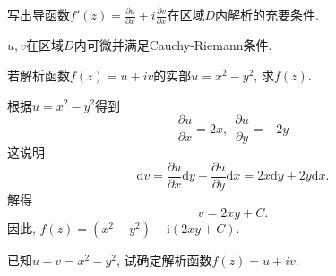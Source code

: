 \begin{yyEx}
	写出导函数$f'(z) = \frac{\partial u}{\partial x}+i\frac{\partial v}{\partial x}$在区域$D$内解析的充要条件.
\end{yyEx}

\begin{yySolution}
    $u,v$在区域$D$内可微并满足Cauchy-Riemann条件.
\end{yySolution}

\begin{yyEx}
	若解析函数$f(z) = u+iv$的实部$u = x^2 - y^2$, 求$f(z)$.
\end{yyEx}

\begin{yySolution}
    根据$u = x^2 - y^2$得到\begin{equation*}
        \frac{\partial u}{\partial x} = 2x,~~\frac{\partial u}{\partial y} = -2y
    \end{equation*}
    这说明\begin{equation*}
        \mathrm{d}v = \frac{\partial u}{\partial x}\mathrm{d}y - \frac{\partial u}{\partial y}\mathrm{d}x = 2x\mathrm{d}y +2y\mathrm{d}x.
    \end{equation*}
    解得\begin{equation*}
        v = 2xy + C.
    \end{equation*}
    因此, $f(z) = (x^2-y^2)+\mathrm{i}(2xy+C)$.
\end{yySolution}

\begin{yyEx}
	已知$u-v = x^2 - y^2$, 试确定解析函数$f(z) = u + iv$.
\end{yyEx}

